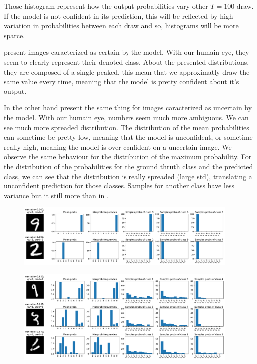 Those histogram represent how the output probabilities vary other $ T=100 $ draw. If the model is not confident in its prediction, this will be reflected by high variation in probabilities between each draw and so, histograms will be more sparce.

 present images caracterized as certain by the model. With our humain eye, they seem to clearly represent their denoted class. About the presented distributions, they are composed of a single peaked, this mean that we approximatly draw the same value every time, meaning that the model is pretty confident about it's output. 

In the other hand  present the same thing for images caracterized as uncertain by the model. With our humain eye, numbers seem much more ambiguous. We can see much more spreaded distribution. The distribution of the mean probabilities can sometime be pretty low, meaning that the model is unconfident, or sometime really high, meaning the model is over-confident on a uncertain image. We observe the same behaviour for the distribution of the maximum probability. For the distribution of the probabilities for the ground thruth class and the predicted class, we can see that the distribution is really spreaded (large std), translating a unconfident prediction for those classes. Samples for another class have less variance but it still more than in .


\begin{figure}[H]
    \centering
    \includegraphics[width=0.95\textwidth]{var-ratio_certain_images.pdf}
    \caption{}
    \label{fig:varratio_certain}
\end{figure}
\begin{figure}[H]
    \centering
    \includegraphics[width=0.95\textwidth]{var-ratio_uncertain_images.pdf}
    \caption{}
    \label{fig:varratio_uncertain}
\end{figure}

